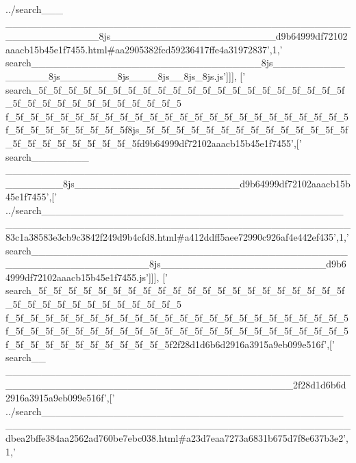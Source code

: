 \begin{DoxyCode}
{      ../search\_\_\_
      \_\_\_\_\_\_\_\_\_\_\_\_\_\_\_\_\_\_\_\_\_\_\_\_\_\_\_\_\_\_\_\_\_\_\_\_\_\_\_\_\_\_\_\_\_\_\_\_\_\_\_\_\_\_\_\_\_\_\_\_\_8js\_\_\_\_\_\_\_\_\_\_\_\_\_\_\_\_\_\_\_\_\_\_\_d9b64999df72102aaacb15b45e1f7455.html#aa2905382fcd59236417ffe4a31972837'},1,\textcolor{stringliteral}{'
      search\_\_\_\_\_\_\_\_\_\_\_\_\_\_\_\_\_\_\_\_\_\_\_\_\_\_\_\_\_\_\_\_8js\_\_\_\_\_\_\_\_\_\_\_\_\_\_\_\_8js\_\_\_\_\_\_\_\_8js\_\_\_\_8js\_\_8js\_8js.js'}]]],
  [\textcolor{stringliteral}{'
      search\_5f\_5f\_5f\_5f\_5f\_5f\_5f\_5f\_5f\_5f\_5f\_5f\_5f\_5f\_5f\_5f\_5f\_5f\_5f\_5f\_5f\_5f\_5f\_5f\_5f\_5f\_5f\_5f\_5f\_5f\_5f\_5f\_5
      f\_5f\_5f\_5f\_5f\_5f\_5f\_5f\_5f\_5f\_5f\_5f\_5f\_5f\_5f\_5f\_5f\_5f\_5f\_5f\_5f\_5f\_5f\_5f\_5f\_5f\_5f\_5f\_5f\_5f\_5f\_5f8js\_5f\_5f\_5f\_5f\_5f\_5f\_5f\_5f\_5f\_5f\_5f\_5f\_5f\_5f\_5f\_5f\_5f\_5f\_5f\_5f\_5f\_5f\_5fd9b64999df72102aaacb15b45e1f7455'},[\textcolor{stringliteral}{'
      search\_\_\_\_\_\_\_\_
      \_\_\_\_\_\_\_\_\_\_\_\_\_\_\_\_\_\_\_\_\_\_\_\_\_\_\_\_\_\_\_\_\_\_\_\_\_\_\_\_\_\_\_\_\_\_\_\_\_\_\_\_\_\_\_\_8js\_\_\_\_\_\_\_\_\_\_\_\_\_\_\_\_\_\_\_\_\_\_\_d9b64999df72102aaacb15b45e1f7455'},[\textcolor{stringliteral}{'
      ../search\_\_\_\_\_\_\_\_\_\_\_\_\_\_\_\_\_\_\_\_\_\_\_\_\_\_\_\_\_\_\_\_\_\_\_\_\_\_\_\_\_\_\_\_\_\_\_\_\_\_\_\_\_\_\_\_\_\_\_\_\_\_\_\_\_\_\_\_\_\_\_\_\_\_\_\_\_\_\_\_\_\_\_\_\_\_\_\_\_\_83c1a38583e3cb9c3842f249d9b4cfd8.html#a412ddff5aee72990c926af4e442ef435'},1,\textcolor{stringliteral}{'
      search\_\_\_\_\_\_\_\_\_\_\_\_\_\_\_\_\_\_\_\_\_\_\_\_\_\_\_\_\_\_\_\_\_\_\_\_\_\_\_\_\_\_\_\_\_\_\_\_\_\_\_\_\_\_\_\_\_\_\_\_\_\_\_\_8js\_\_\_\_\_\_\_\_\_\_\_\_\_\_\_\_\_\_\_\_\_\_\_d9b64999df72102aaacb15b45e1f7455.js'}]]],
  [\textcolor{stringliteral}{'
      search\_5f\_5f\_5f\_5f\_5f\_5f\_5f\_5f\_5f\_5f\_5f\_5f\_5f\_5f\_5f\_5f\_5f\_5f\_5f\_5f\_5f\_5f\_5f\_5f\_5f\_5f\_5f\_5f\_5f\_5f\_5f\_5f\_5
      f\_5f\_5f\_5f\_5f\_5f\_5f\_5f\_5f\_5f\_5f\_5f\_5f\_5f\_5f\_5f\_5f\_5f\_5f\_5f\_5f\_5f\_5f\_5f\_5f\_5f\_5f\_5f\_5f\_5f\_5f\_5f\_5f\_5f\_5f\_5f\_5f\_5f\_5f\_5f\_5f\_5f\_5f\_5f\_5f\_5f\_5f\_5f\_5f\_5f\_5f\_5f\_5f\_5f\_5f\_5f\_5f\_5f2f28d1d6b6d2916a3915a9eb099e516f'},[\textcolor{stringliteral}{'
      search\_\_
      \_\_\_\_\_\_\_\_\_\_\_\_\_\_\_\_\_\_\_\_\_\_\_\_\_\_\_\_\_\_\_\_\_\_\_\_\_\_\_\_\_\_\_\_\_\_\_\_\_\_\_\_\_\_\_\_\_\_\_\_\_\_\_\_\_\_\_\_\_\_\_\_\_\_\_\_\_\_\_\_\_\_\_\_\_\_\_\_2f28d1d6b6d2916a3915a9eb099e516f'},[\textcolor{stringliteral}{'
      ../search\_\_\_\_\_\_\_\_\_\_\_\_\_\_\_\_\_\_\_\_\_\_\_\_\_\_\_\_\_\_\_\_\_\_\_\_\_\_\_\_\_\_\_\_\_\_\_\_\_\_\_\_\_\_\_\_\_\_\_\_\_\_\_\_\_\_\_\_\_\_\_\_\_\_\_\_\_\_\_\_\_\_\_\_\_\_\_\_\_\_dbea2bffe384aa2562ad760be7ebc038.html#a23d7eaa7273a6831b675d7f8e637b3e2'},1,\textcolor{stringliteral}{'
}
\end{DoxyCode}
